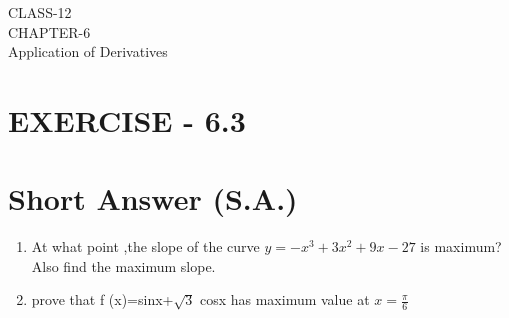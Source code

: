 \documentclass[12pt]{article}
\begin{document}
\begin{center}
\textbf\large{CLASS-12\\CHAPTER-6 \\ Application of Derivatives}
\end{center}

\section*{EXERCISE - 6.3}
\section*{Short Answer (S.A.)}
\fi
\begin{enumerate}
\item At what point ,the slope of the curve $y=-x^3+3x^2+9x-27$ is maximum? Also find the maximum slope.
\item prove that f (x)=sinx+$\sqrt{3}$ cosx has maximum value at $x=\frac{\pi}{6}$

\end{enumerate}
\end{document}

